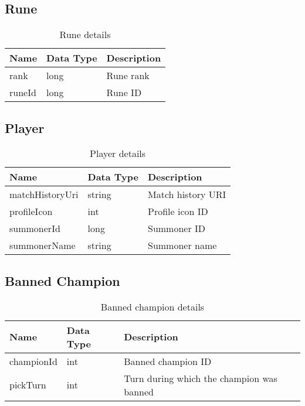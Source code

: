 \FloatBarrier
\subsection{Rune}
\begin{table}[!htb]
\footnotesize
\centering
\begin{tabular}{|llp{5cm}|}
\hline
\textbf{Name} & \textbf{Data Type} & \textbf{Description} \\ \hline
rank          & long               & Rune rank            \\ \hline
runeId        & long               & Rune ID              \\ \hline
\end{tabular}
\caption{Rune details}\label{tab:rune}
\end{table}


\FloatBarrier
\subsection{Player}
\begin{table}[!htb]
\footnotesize
\centering
\begin{tabular}{|llp{5cm}|}
\hline
\textbf{Name}   & \textbf{Data Type} & \textbf{Description} \\ \hline
matchHistoryUri & string             & Match history URI    \\ \hline
profileIcon     & int                & Profile icon ID      \\ \hline
summonerId      & long               & Summoner ID          \\ \hline
summonerName    & string             & Summoner name        \\ \hline
\end{tabular}
\caption{Player details}\label{tab:player}
\end{table}


\FloatBarrier
\subsection{Banned Champion}
\begin{table}[!htb]
\footnotesize
\centering
\begin{tabular}{|llp{5cm}|}
\hline
\textbf{Name} & \textbf{Data Type} & \textbf{Description}                      \\ \hline
championId    & int                & Banned champion ID                        \\ \hline
pickTurn      & int                & Turn during which the champion was banned \\ \hline
\end{tabular}
\caption{Banned champion details}\label{tab:banned}
\end{table}


